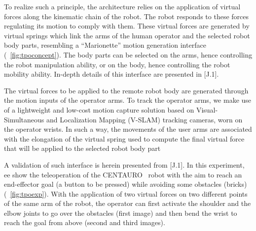 
To realize such a principle, the architecture relies on the application of virtual forces along the kinematic chain of the robot. The robot responds to these forces regulating its motion to comply with them. These virtual forces are generated by virtual springs which link the arms of the human operator and the selected robot body parts, resembling a \enquote{Marionette} motion generation interface (\figurename~\ref{fig:tpoconcept}). The body parts can be selected on the arms, hence controlling the robot manipulation ability, or on the body, hence controlling the robot mobility ability. In-depth details of this interface are presented in [J.1].

The virtual forces to be applied to the remote robot body are generated through the motion inputs of the operator arms. To track the operator arms, we make use of a lightweight and low-cost motion capture solution based on Visual-Simultaneous and Localization Mapping (V-SLAM) tracking cameras, worn on the operator wrists. In such a way, the movements of the user arms are associated with the elongation of the virtual spring used to compute the final virtual force that will be applied to the selected robot body part

A validation of such interface is herein presented from [J.1]. In this experiment, ee show the teleoperation of the CENTAURO~\cite{Centauro2} robot with the aim to reach an end-effector goal (a button to be pressed) while avoiding some obstacles (bricks) (\figurename~\ref{fig:tpoexp}). With the application of two virtual forces on two different points of the same arm of the robot, the operator can first activate the shoulder and the elbow joints to go over the obstacles (first image) and then bend the wrist to reach the goal from above (second and third images).   

